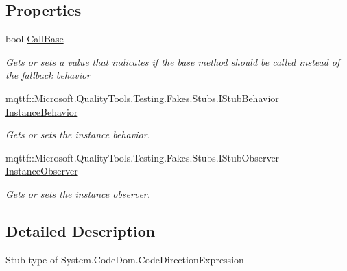\subsection*{Properties}
\begin{DoxyCompactItemize}
\item 
bool \hyperlink{class_system_1_1_code_dom_1_1_fakes_1_1_stub_code_direction_expression_aae514affd27491915e47d4a186b77943}{Call\-Base}
\begin{DoxyCompactList}\small\item\em Gets or sets a value that indicates if the base method should be called instead of the fallback behavior\end{DoxyCompactList}\item 
mqttf\-::\-Microsoft.\-Quality\-Tools.\-Testing.\-Fakes.\-Stubs.\-I\-Stub\-Behavior \hyperlink{class_system_1_1_code_dom_1_1_fakes_1_1_stub_code_direction_expression_ad3dd5b794a0e92f513b08c9172bfeb03}{Instance\-Behavior}
\begin{DoxyCompactList}\small\item\em Gets or sets the instance behavior.\end{DoxyCompactList}\item 
mqttf\-::\-Microsoft.\-Quality\-Tools.\-Testing.\-Fakes.\-Stubs.\-I\-Stub\-Observer \hyperlink{class_system_1_1_code_dom_1_1_fakes_1_1_stub_code_direction_expression_ab573b6450ffcf4f299a9088480478b2d}{Instance\-Observer}
\begin{DoxyCompactList}\small\item\em Gets or sets the instance observer.\end{DoxyCompactList}\end{DoxyCompactItemize}


\subsection{Detailed Description}
Stub type of System.\-Code\-Dom.\-Code\-Direction\-Expression



